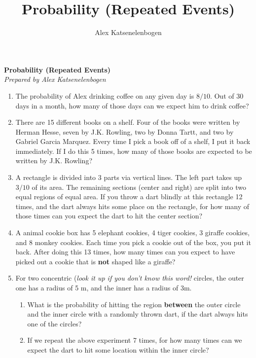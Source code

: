 \documentclass{article}
\title{Probability (Repeated Events)}
\author{Alex Katsenelenbogen}
\begin{document}
\begin{center}
      \Large\textbf{Probability (Repeated Events)}\\
      \large\textit{Prepared by Alex Katsenelenbogen}
   \end{center}

\begin{enumerate}

\item
The probability of Alex drinking coffee on any given day is $8/10$. Out of
30 days in a month, how many of those days can we expect him to drink coffee?

\item 
There are 15 different books on a shelf. Four of the books were written
by Herman Hesse, seven by J.K. Rowling, two by Donna Tartt, and
two by Gabriel Garcia Marquez. Every time I pick a book off of a shelf, 
I put it back immediately. If I do this 5 times, how many of those books
are expected to be written by J.K. Rowling?

\item
A rectangle is divided into 3 parts via vertical lines. The left part takes up $3/10$ of its area. The remaining sections (center and right) are split into 
two equal regions of equal area. If you throw a dart blindly at this rectangle 12 times, and the dart always hits some place on the rectangle, for how many of those times can you expect the dart to hit the center section?

\item 
A animal cookie box has 5 elephant cookies, 4 tiger cookies, 3
giraffe cookies, and 8 monkey cookies. Each time you pick a cookie out of the box, you put it back. After doing this 13 times, how many times can you expect to have picked out a cookie that is \textbf{not} shaped like a giraffe?

\item 
For two concentric (\textit{look it up if you don't know this word!} circles, the outer one has a radius of 5 m, and the inner has a radius of 3m.
\begin{enumerate}
\item What is the probability of hitting the region \textbf{between} the outer 
circle and the inner circle with a randomly thrown dart, if the dart always hits one of the circles?
\item If we repeat the above experiment 7 times, for how many times can we expect the dart to hit some location within the inner circle?
\end{enumerate}

\end{enumerate}
\end{document}
